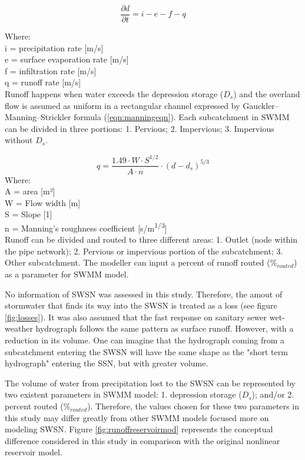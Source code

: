 \begin{equation}
\label{eqn:reservoircontinuity}
\frac{\partial d}{\partial t} = i - e - f - q
\end{equation}

Where:\\
i = precipitation rate [m/s]\\
e = surface evaporation rate [m/s]\\
f = infiltration rate [m/s]\\
q = runoff rate [m/s]\\

Runoff happens when water exceeds the depression storage ($D_s$) and the overland flow is assumed as uniform in a rectangular channel expressed by Gauckler–Manning–Strickler formula (\ref{eqn:manningeqn}). Each subcatchment in SWMM can be divided in three portions: 1. Pervious; 2. Impervious; 3. Impervious without $D_s$.

\begin{equation}
\label{eqn:manningeqn}
q =  \frac{1.49 \cdot W \cdot S^{1/2}}{A \cdot n} \cdot (d - d_s)^{5/3} 
\end{equation}
Where: \\
A = area [m²]\\
W = Flow width [m]\\
S = Slope [1]\\
n = Manning's roughness coefficient [s/m\textsuperscript{1/3}] \\

Runoff can be divided and routed to three different areas: 1. Outlet (node within the pipe network); 2. Pervious or impervious portion of the subcatchment; 3. Other subcatchment. The modeller can input a percent of runoff routed ($\%_{routed}$) as a parameter for SWMM model.

No information of \acf{SWSN} was assessed in this study. Therefore, the amout of stormwater that finds its way into the \ac{SWSN} is treated as a loss (see figure \ref{fig:losses}). It was also assumed that the fast response on sanitary sewer wet-weather hydrograph follows the same pattern as surface runoff. However, with a reduction in its volume. One can imagine that the hydrograph coming from a subcatchment entering the \ac{SWSN} will have the same shape as the "short term hydrograph" entering the \acf{SSN}, but with greater volume. 

The volume of water from precipitation lost to the \ac{SWSN} can be represented by two existent parameters in SWMM model: 1. depression storage ($D_s$); and/or 2. percent routed ($\%_{routed}$). Therefore, the values chosen for these two parameters in this study may differ greatly from other SWMM models focused more on modeling \ac{SWSN}. Figure \ref{fig:runoffreservoirmod} represents the conceptual difference considered in this study in comparison with the original nonlinear reservoir model.


